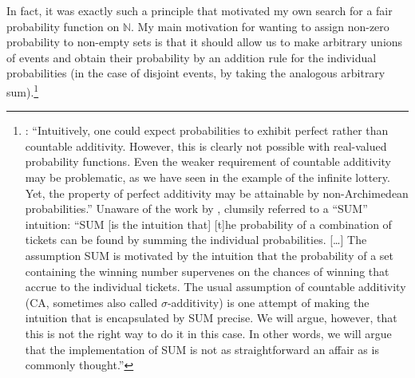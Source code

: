 In fact, it was exactly such a principle that motivated my own search for a fair probability function on $\mathbb{N}$.
My main motivation for wanting to assign non-zero probability to non-empty sets is that it should allow us to make arbitrary unions of events and obtain their probability by an addition rule for the individual probabilities (in the case of disjoint events, by taking the analogous arbitrary sum).\footnote{\citet[p.~36]{Wenmackers:2011a}: ``Intuitively, one could expect probabilities to exhibit perfect rather than countable additivity. However, this is clearly not possible with real-valued probability functions. Even the weaker requirement of countable additivity may be problematic, as we have seen in the example of the infinite lottery. Yet, the property of perfect additivity may be attainable by non-Archimedean probabilities.'' Unaware of the work by \citet{Skyrms:1983a}, \citet[p.~40]{WenmackersHorsten:2013} clumsily referred to a ``SUM'' intuition: ``SUM [is the intuition that] [t]he probability of a combination of tickets can be found by summing the individual probabilities. [\ldots] The assumption SUM is motivated by the intuition that the probability of a set containing the winning number supervenes on the chances of winning that accrue to the individual tickets. The usual assumption of countable additivity (CA, sometimes also called $\sigma$-additivity) is one attempt of making the intuition that is encapsulated by SUM precise. We will argue, however, that this is not the right way to do it in this case. In other words, we will argue that the implementation of SUM is not as straightforward an affair as is commonly thought.''}

